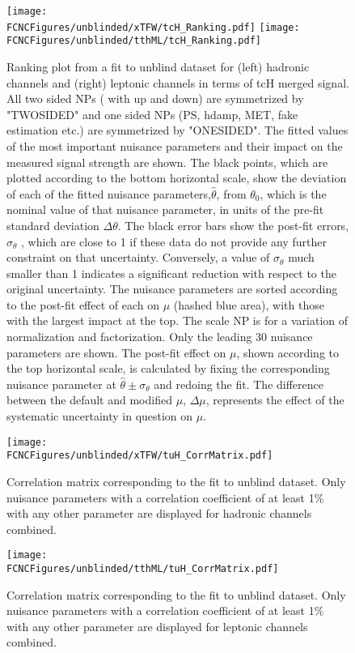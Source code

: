 \begin{figure}[htb]
\centering
\texttt{[image: \\FCNCFigures/unblinded/xTFW/tcH\_Ranking.pdf]}
\texttt{[image: \\FCNCFigures/unblinded/tthML/tcH\_Ranking.pdf]}
\caption{ Ranking plot from a fit to unblind dataset for (left) hadronic channels and (right)
leptonic channels in terms of tcH merged signal. All two sided NPs ( with up and down) are symmetrized by "TWOSIDED" and one sided NPs (PS, hdamp, MET, fake estimation etc.) are symmetrized by "ONESIDED". The fitted values of the most important nuisance parameters and their impact on the measured
signal strength are shown. The black points, which are plotted according to the bottom horizontal scale, show the deviation
of each of the fitted nuisance parameters,$\hat{\theta}$, from $\theta_{0}$, which is the nominal value of that nuisance parameter, in units of the
pre-fit standard deviation $\Delta\theta$. The black error bars show the post-fit errors, $\sigma_{\theta}$ , which are close to 1 if these data do not
provide any further constraint on that uncertainty. Conversely, a value of $\sigma_{\theta}$ much smaller than 1 indicates a significant
reduction with respect to the original uncertainty. The nuisance parameters are sorted according to the post-fit effect of each on $\mu$ (hashed blue area),
with those with the largest impact at the top. The scale NP is for a variation of normalization and factorization. Only the leading 30 nuisance parameters are shown. The post-fit effect on $\mu$,
shown according to the top horizontal scale, is calculated by fixing the corresponding nuisance parameter at $\hat{\theta}\pm \sigma_{\theta}$ and
redoing the fit. The difference between the default and modified $\mu$, $\Delta\mu$, represents the effect of the systematic uncertainty
in question on $\mu$.}
\label{fig:fcnc_rank_data_tcH}
\end{figure}





\begin{figure}[htb]
\centering
\texttt{[image: \\FCNCFigures/unblinded/xTFW/tuH\_CorrMatrix.pdf]}
\caption{ Correlation matrix corresponding to the fit to unblind dataset. Only nuisance parameters with a correlation coefficient of at least 1\% with any other parameter are displayed for hadronic channels combined.}
\label{fig:fcnc_correl_data_1}
\end{figure}


\begin{figure}[htb]
\centering
\texttt{[image: \\FCNCFigures/unblinded/tthML/tuH\_CorrMatrix.pdf]}
\caption{ Correlation matrix corresponding to the fit to unblind dataset. Only nuisance parameters with a correlation coefficient of at least 1\% with any other parameter are displayed for leptonic channels combined.}
\label{fig:fcnc_correl_data_2}
\end{figure}





